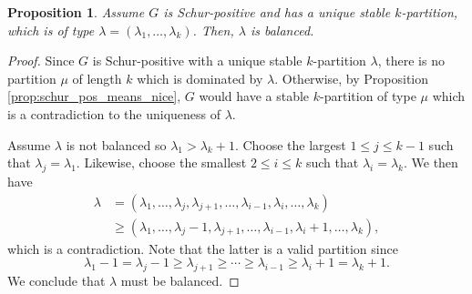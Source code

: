 \documentclass[12pt]{amsart}
\numberwithin{equation}{section}
\theoremstyle{plain}
\newtheorem{proposition}[equation]{Proposition}
\theoremstyle{definition}
\theoremstyle{remark}
\begin{document}
\begin{proposition}
\label{prop:only_balanced_partitions}
Assume $G$ is Schur-positive and has a unique stable $k$-partition, which is of type $\lambda=(\lambda_1,\dots,\lambda_k)$. Then, $\lambda$ is balanced.
\end{proposition}
\begin{proof}


Since $G$ is Schur-positive with a unique stable $k$-partition $\lambda$, there is no partition $\mu$ of length $k$ which is dominated by $\lambda$. Otherwise, by Proposition \ref{prop:schur_pos_means_nice}, $G$ would have a stable $k$-partition of type $\mu$ which is a contradiction to the uniqueness of $\lambda$.






Assume $\lambda$ is not balanced so $\lambda_1>\lambda_k+1$. Choose the largest $1\le j \le k-1$ such that $\lambda_j=\lambda_1$. Likewise, choose the smallest $2\le i \le k$ such that $\lambda_i=\lambda_k$. We then have
\begin{align*}
\lambda&=(\lambda_1,\dots,\lambda_j,\lambda_{j+1},\dots, \lambda_{i-1},\lambda_i,\dots,\lambda_k)\\
&\ge (\lambda_1,\dots,\lambda_j-1,\lambda_{j+1},\dots,\lambda_{i-1},\lambda_{i}+1,\dots,\lambda_k),
\end{align*}
which is a contradiction. Note that the latter is a valid partition since
\[
\lambda_1-1=\lambda_j-1 \ge \lambda_{j+1}\ge\cdots\ge \lambda_{i-1}\ge {\lambda_i+1}=\lambda_k+1.
\]
We conclude that $\lambda$ must be balanced.
\end{proof}



\end{document}
